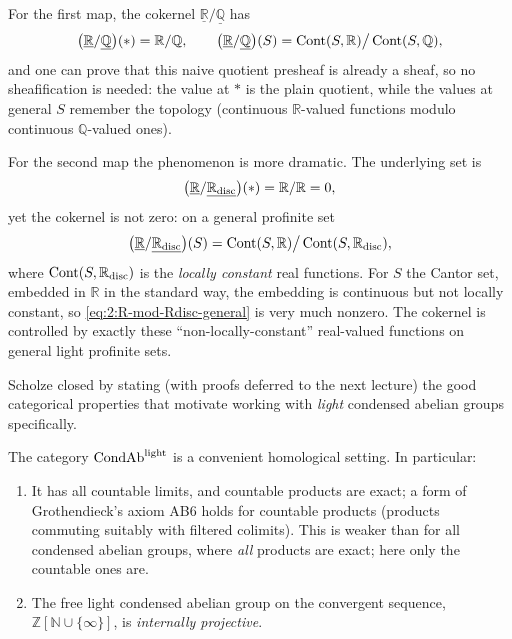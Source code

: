 \begin{example}
\label{ex:2:cokernels}
For the first map, the cokernel $\underline{\mathbb{R}}/\underline{\mathbb{Q}}$
has
\begin{equation*}
\bigl(\underline{\mathbb{R}}/\underline{\mathbb{Q}}\bigr)(\ast)=\mathbb{R}/\mathbb{Q},
\qquad
\bigl(\underline{\mathbb{R}}/\underline{\mathbb{Q}}\bigr)(S)
=\operatorname{Cont}(S,\mathbb{R})\big/\operatorname{Cont}(S,\mathbb{Q}),
\end{equation*}
and one can prove that this naive quotient presheaf is already a sheaf, so no
sheafification is needed: the value at $\ast$ is the plain quotient, while the
values at general $S$ remember the topology (continuous $\mathbb{R}$-valued
functions modulo continuous $\mathbb{Q}$-valued ones).

For the second map the phenomenon is more dramatic. The underlying set is
\begin{equation*}
\bigl(\underline{\mathbb{R}}/\underline{\mathbb{R}_{\mathrm{disc}}}\bigr)(\ast)=\mathbb{R}/\mathbb{R}=0,
\end{equation*}
yet the cokernel is not zero: on a general profinite set
\begin{equation}
\label{eq:2:R-mod-Rdisc-general}
\bigl(\underline{\mathbb{R}}/\underline{\mathbb{R}_{\mathrm{disc}}}\bigr)(S)
=\operatorname{Cont}(S,\mathbb{R})\big/\operatorname{Cont}(S,\mathbb{R}_{\mathrm{disc}}),
\end{equation}
where $\operatorname{Cont}(S,\mathbb{R}_{\mathrm{disc}})$ is the \emph{locally constant} real functions. For $S$
the Cantor set, embedded in $\mathbb{R}$ in the standard way, the embedding is
continuous but not locally constant, so \eqref{eq:2:R-mod-Rdisc-general} is very
much nonzero. The cokernel is controlled by exactly these ``non-locally-constant''
real-valued functions on general light profinite sets.
\end{example}

Scholze closed by stating (with proofs deferred to the next lecture) the good
categorical properties that motivate working with \emph{light} condensed abelian
groups specifically.

\begin{theorem}
\label{thm:2:condab-properties}
The category $\mathrm{CondAb}^{\mathrm{light}}$ is a convenient homological setting. In particular:
\begin{enumerate}
\item It has all countable limits, and countable products are exact; a form of
Grothendieck's axiom \textup{AB6} holds for countable products (products
commuting suitably with filtered colimits). This is weaker than for all condensed
abelian groups, where \emph{all} products are exact; here only the countable ones
are.
\item The free light condensed abelian group on the convergent sequence,
$\mathbb{Z}[\mathbb{N}\cup\{\infty\}]$, is \emph{internally projective}.
\end{enumerate}
\end{theorem}

